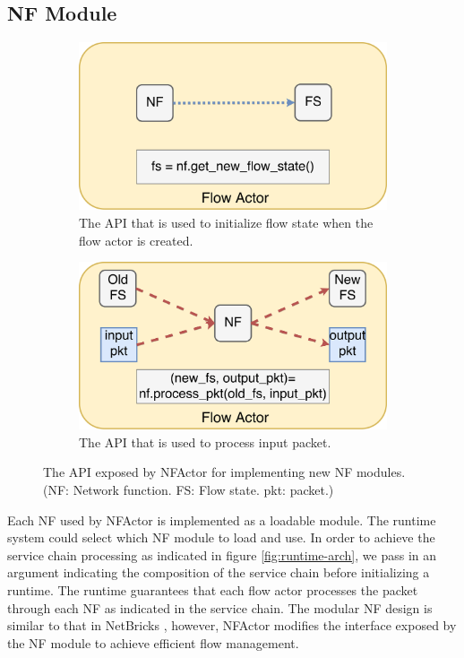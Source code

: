 \subsection{NF Module}

\begin{figure}[!h]
\begin{subfigure}[t]{0.49\linewidth}
   \centering
   \includegraphics[width=\columnwidth]{figure/nf-module-api-init.pdf}
   \caption{The API that is used to initialize flow state when the flow actor is created.}\label{fig:init-api}
  \end{subfigure}\hfill
  \begin{subfigure}[t]{0.49\linewidth}
 \centering
   \includegraphics[width=\columnwidth]{figure/nf-module-api-process_pkt.pdf}
   \caption{The API that is used to process input packet.}\label{fig:pkt-process-api} \end{subfigure}\hfill
 \caption{The API exposed by NFActor for implementing new NF modules. (NF: Network function. FS: Flow state. pkt: packet.)}
\label{fig:api}
\end{figure}

Each NF used by NFActor is implemented as a loadable module. The runtime system could select which NF module to load and use. In order to achieve the service chain processing as indicated in figure \ref{fig:runtime-arch}, we pass in an argument indicating the composition of the service chain before initializing a runtime. The runtime guarantees that each flow actor processes the packet through each NF as indicated in the service chain. The modular NF design is similar to that in NetBricks \cite{199352}, however, NFActor modifies the interface exposed by the NF module to achieve efficient flow management.


